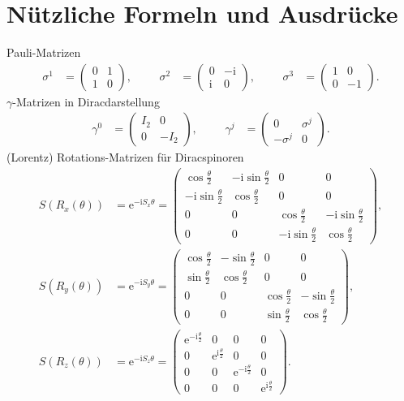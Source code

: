 \documentclass[german, parskip=full]{scrartcl}
\newcommand{\I}{\text{i}}
\newcommand{\e}{\text{e}}
\begin{document}
\newpage
\appendix
\section{Nützliche Formeln und Ausdrücke}
Pauli-Matrizen
\begin{align}
\sigma^1&=\begin{pmatrix}
0&1\\ 1&0
\end{pmatrix},&&&\sigma^2&=\begin{pmatrix}
0&-\I\\ \I&0
\end{pmatrix},&&&\sigma^3&=\begin{pmatrix}
1&0\\ 0&-1
\end{pmatrix}.\label{eqn:PauliMatrizen}
\end{align}
$\gamma$-Matrizen in Diracdarstellung
\begin{align}
\gamma^0&=\begin{pmatrix}
I_2 & 0 \\ 0 & -I_2
\end{pmatrix},&&&\gamma^j&=\begin{pmatrix}
0&\sigma^j\\-\sigma^j &0
\end{pmatrix}. \label{eqn:GammaMatrizenDirac}
\end{align}
(Lorentz) Rotations-Matrizen für Diracspinoren
\begin{align}
S(R_x(\theta))&=\e^{-\I S_x\theta}=\begin{pmatrix}
\cos\frac{\theta}{2}&-\I\sin\frac{\theta}{2}&0&0\\
-\I\sin\frac{\theta}{2}&\cos\frac{\theta}{2}&0&0\\
0&0&\cos\frac{\theta}{2}&-\I\sin\frac{\theta}{2}\\
0&0&-\I\sin\frac{\theta}{2}&\cos\frac{\theta}{2}
\end{pmatrix}, \label{eqn:RotationsMatrizenSX}\\
S(R_y(\theta))&=\e^{-\I S_y\theta}=\begin{pmatrix}
\cos\frac{\theta}{2}&-\sin\frac{\theta}{2}&0&0\\
\sin\frac{\theta}{2}&\cos\frac{\theta}{2}&0&0\\
0&0&\cos\frac{\theta}{2}&-\sin\frac{\theta}{2}\\
0&0&\sin\frac{\theta}{2}&\cos\frac{\theta}{2}
\end{pmatrix}, \label{eqn:RotationsMatrizenSY}\\
S(R_z(\theta))&=\e^{-\I S_z\theta}=\begin{pmatrix}
\e^{-\I\frac{\theta}{2}}&0&0&0\\
0&\e^{\I\frac{\theta}{2}}&0&0\\
0&0&\e^{-\I\frac{\theta}{2}}&0\\
0&0&0&\e^{\I\frac{\theta}{2}}
\end{pmatrix}. \label{eqn:RotationsMatrizenSZ}
\end{align}
\end{document}

